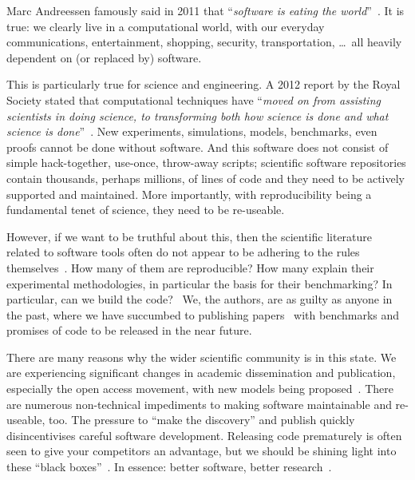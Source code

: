 \documentclass[conference]{IEEEtran}
\begin{document}
Marc Andreessen famously said in 2011 that ``{\emph{software is eating the
world}}''~\cite{andreessen:2011}. It is true: we clearly live in a
computational world, with our everyday communications, entertainment,
shopping, security, transportation, \dots\ all heavily dependent on
(or replaced by) software.

This is particularly true for science and engineering. A 2012 report
by the Royal Society stated that computational techniques have
``{\emph{moved on from assisting scientists in doing science, to
transforming both how science is done and what science is
done}}''~\cite{rssaaoe:2012}. New experiments, simulations, models,
benchmarks, even proofs cannot be done without software. And this
software does not consist of simple hack-together, use-once,
throw-away scripts; scientific software repositories contain
thousands, perhaps millions, of lines of code and they need to be
actively supported and maintained. More importantly, with
reproducibility being a fundamental tenet of science, they need to be
re-useable.

However, if we want to be truthful about this, then the scientific
literature related to software tools often do not appear to be
adhering to the rules themselves~\cite{nature:2011}. How many of them are
reproducible? How many explain their experimental methodologies, in
particular the basis for their benchmarking? In particular, can we build the
code?~\cite{collberg-et-al:2014} We, the authors, are as guilty as
anyone in the past, where we have succumbed to publishing
papers~\cite{crick-et-al:2009,Berdine2011SLAyer} with benchmarks and
promises of code to be released in the near future.

There are many reasons why the wider scientific community is in this
state. We are experiencing significant changes in academic
dissemination and publication, especially the open access movement,
with new models being
proposed~\cite{stodden-et-al:2013,fursin+dubach:2014}.  There are
numerous non-technical impediments to making software maintainable and
re-useable, too. The pressure to ``make the discovery'' and publish
quickly disincentivises careful software development. Releasing code
prematurely is often seen to give your competitors an advantage, but
we should be shining light into these ``black
boxes''~\cite{morin-et-al:2012}. In essence: better software, better
research~\cite{goble:2014}.
\end{document}
